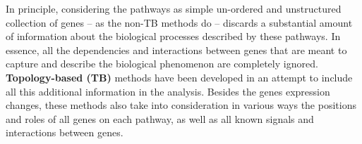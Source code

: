 \begin{itemize}
\end{itemize}

 


In principle, considering the pathways as simple un-ordered and unstructured collection of genes -- as the non-TB methods do -- discards a substantial amount of information about the biological processes described by these pathways. In essence, all the dependencies and interactions between genes that are meant to capture and describe the biological phenomenon are completely ignored. 
 \textbf{Topology-based (TB)} methods have been developed in an attempt to include all this additional information in the analysis.
Besides the genes expression changes, these methods  also take into consideration in various ways the positions and roles of all genes on each pathway, as well as all known signals and interactions between genes. 

